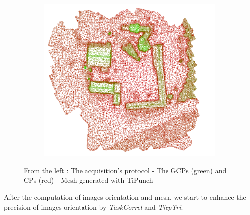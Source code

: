 \begin{figure}
\begin{subfigure}[b]{0.33\textwidth}
        \end{subfigure}%
                \hfill
        \begin{subfigure}[b]{0.33\textwidth}
                \includegraphics[width=\linewidth]{FIGS/TaskCorrel/Viabon/mesh_2.png}
        \end{subfigure}%
        \caption{From the left : The acquisition's protocol - The GCPs (green) and CPs (red) - Mesh generated with TiPunch}
    \label{fig:viabon_3img}
\end{figure}        

After the computation of images orientation and mesh, we start to enhance the precision of images orientation by \textit{TaskCorrel} and \textit{TiepTri}.

